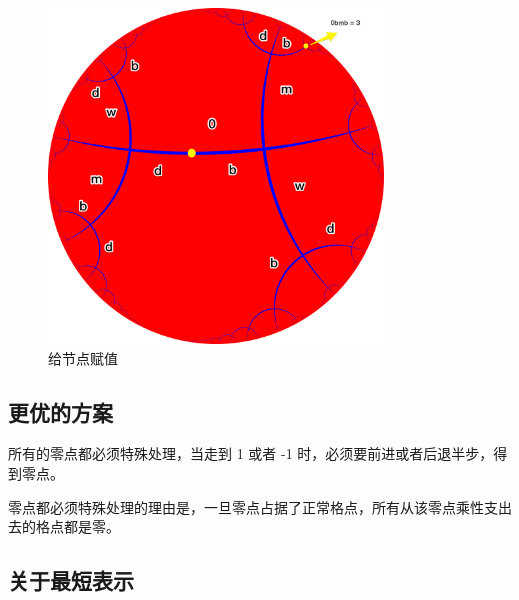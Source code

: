 \documentclass[a4paper,12pt]{article}
\begin{document}
\begin{figure}[ht]
\centering
\includegraphics[width=3.5in]{images/H2_tiling_with_assign.png}
\caption{给节点赋值}
\end{figure}

\subsection{更优的方案}

所有的零点都必须特殊处理，当走到 1 或者 -1 时，必须要前进或者后退半步，得到零点。

零点都必须特殊处理的理由是，一旦零点占据了正常格点，所有从该零点乘性支出去的格点都是零。

\subsection{关于最短表示}
\end{document}
